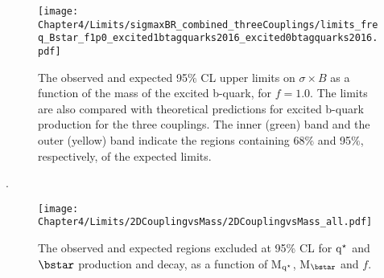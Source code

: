 \vspace{-0.5in}

\begin{figure}[htbp]
\centering
\texttt{[image: Chapter4/Limits/sigmaxBR\_combined\_threeCouplings/limits\_freq\_Bstar\_f1p0\_excited1btagquarks2016\_excited0btagquarks2016.pdf]}
 \caption{The observed and expected 95$\%$ CL upper limits on $\sigma\times{B}$ as a function of the mass of the excited b-quark, for $f = 1.0$. 
 The limits are also compared with theoretical predictions for excited b-quark production for the three couplings. The inner (green) band
and the outer (yellow) band indicate the regions containing 68$\%$ and 95$\%$, respectively, of the expected limits.}
\label{fig:bstarlimit_allcoup}
\end{figure}

\clearpage

{\color{white}.}
\vspace{2in}
\begin{figure}[htbp]
\begin{center}
\texttt{[image: Chapter4/Limits/2DCouplingvsMass/2DCouplingvsMass\_all.pdf]}
\caption{The observed and expected regions excluded at 95\% CL for $\mathrm{q^\star}$ and $\bstar$ production and decay, as a function of M$_{\mathrm{q^\star}}$, M$_{\bstar}$ and $f$.} %
\label{fig:2dcoup_all}
\end{center}
\end{figure}






